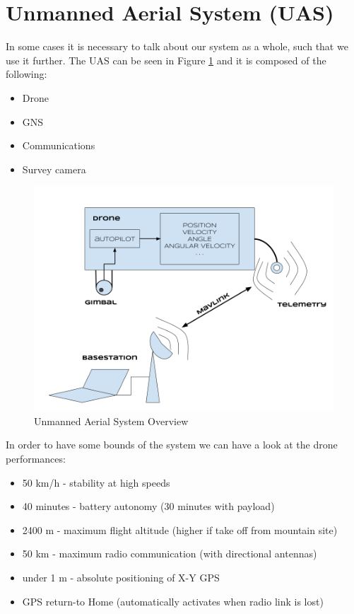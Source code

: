 \section{Unmanned Aerial System (UAS)}
In some cases it is necessary to talk about our system as a whole, such that we use it further. The UAS can be seen in Figure \ref{fig:uas} and it is composed of the following:
\begin{itemize}
	\item Drone
	\item GNS
	\item Communications
	\item Survey camera
\end{itemize}

\begin{figure}[h]
	\centering
	\includegraphics[scale=0.33]{figures/uas.png}
	\caption{Unmanned Aerial System Overview}
	\label{fig:uas}
\end{figure}

In order to have some bounds of the system we can have a look at the drone performances:
\begin{itemize}
	\item 50 km/h - stability at high speeds 
	\item 40 minutes - battery autonomy (30 minutes with payload)
	\item 2400 m - maximum flight altitude (higher if take off from mountain site)
	\item 50 km - maximum radio communication (with directional antennas)
	\item under 1 m - absolute positioning of X-Y GPS
	\item GPS return-to Home (automatically activates when radio link is lost)
\end{itemize}

